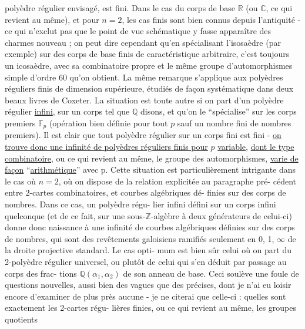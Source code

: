 
polyèdre régulier envisagé, est fini. Dans le cas du corps de
base $\mathbb{R}$ (ou $\mathbb{C}$, ce qui revient au même), et pour $n = 2$, les cas
finis sont bien connus depuis l'antiquité - ce qui n'exclut pas
que le point de vue schématique y fasse apparaître des charmes
nouveau ; on peut dire cependant qu'en spécialisant l'isosaèdre
(par exemple) sur des corps de base finis de caractéristique
arbitraire, c'est toujours un icosaèdre, avec sa combinatoire
propre et le même groupe d'automorphismes simple d'ordre 60 qu'on
obtient. La même remarque s'applique aux polyèdres réguliers finis
de dimension supérieure, étudiés de façon systématique dans deux
beaux livres de Coxeter. La situation est toute autre si on part
d'un polyèdre régulier \uline{infini}, sur un corps tel que $\mathbb{Q}$ disons,
et qu'on le ``spécialise'' sur les corps premiers $\mathbb{F}_p$ (opération
bien définie pour tout $p$ sauf un nombre fini de nombres premiers).
Il est clair que tout polyèdre régulier sur un corps fini est fini -
\uline{on trouve donc une infinité de polyèdres réguliers finis pour} $p$
\uline{variable}, \uline{dont le type combinatoire}, ou ce qui revient au même,
le groupe des automorphismes, \uline{varie de façon} ``\uline{arithmétique}'' avec p.
Cette situation est particulièrement intrigante  dans le cas où
$n = 2$, où on dispose de la relation explicitée au paragraphe pré-%
cédent entre 2-cartes combinatoires, et courbes algébriques dé-%
finies sur des corps de nombres. Dans ce cas, un polyèdre régu-%
lier infini défini sur un corps infini quelconque (et de ce fait,
sur une sous-$\mathbb{Z}$-algèbre à deux générateurs de celui-ci) donne donc
naissance à une infinité de courbes algébriques définies sur des
corps de nombres, qui sont des revêtements galoisiens ramifiés
seulement en 0, 1, $\infty$ de la droite projective standard. Le cas opti-%
mum est bien sûr celui où on part du 2-polyèdre régulier universel,
ou plutôt de celui qui s'en déduit par passage au corps des frac-%
tions $\mathbb{Q}(\alpha_1,\alpha_2)$ de son anneau de base. Ceci soulève une foule de
questions nouvelles, aussi bien des vagues que des précises, dont
je n'ai eu loisir encore d'examiner de plus près aucune - je ne
citerai que celle-ci : quelles sont exactement les 2-cartes régu-%
lières finies, ou ce qui revient au même, les groupes quotients

